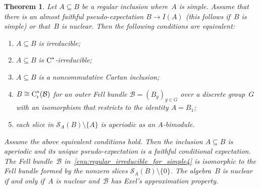 \documentclass[a4paper]{amsart}
\theoremstyle{plain}
\newtheorem{theorem}{Theorem}
\theoremstyle{definition}
\theoremstyle{remark}
\numberwithin{theorem}{section}
\numberwithin{equation}{section}
\newcommand*{\nb}{\nobreakdash}
\newcommand*{\red}{\mathrm{r}}%
\newcommand*{\Cst}{\textup C^*}%
\newcommand*{\Slice}{\mathcal S}%
\newcommand*{\B}{\mathcal B}%
\begin{document}
\begin{theorem}
  \label{thm:regular_irreducible_for_simple}
  Let \(A\subseteq B\) be a regular inclusion where~\(A\) is simple.
  Assume that there is an almost faithful pseudo-expectation \(B\to I(A)\)
  \textup{(}this follows if~\(B\) is simple\textup{)} or that~\(B\) is
  nuclear.
  Then the following conditions are equivalent:
  \begin{enumerate}
  \item \label{enu:regular_irreducible_for_simple1}%
    \(A\subseteq B\) is irreducible;
  \item \label{enu:regular_irreducible_for_simple2}%
    \(A\subseteq B\) is \(\Cst\)\nb-irreducible;
  \item \label{enu:regular_irreducible_for_simple3}%
    \(A\subseteq B\) is a noncommutative Cartan inclusion;
  \item \label{enu:regular_irreducible_for_simple4}%
    \(B\cong \Cst_\red(\B)\)  for an outer Fell bundle
    \(\B=(B_g)_{g\in G}\) over a discrete group~\(G\) with an
    isomorphism that restricts to the identity \(A=B_1\);
  \item \label{enu:regular_irreducible_for_simple5}%
    each slice in \(\Slice_A(B)\setminus \{A\}\) is aperiodic as an
    \(A\)\nb-bimodule.
  \end{enumerate}
  Assume the above equivalent conditions hold.
  Then the inclusion \(A\subseteq B\) is aperiodic and its unique
  pseudo-expectation is a faithful conditional expectation.
  The Fell bundle~\(\B\)
  in~\ref{enu:regular_irreducible_for_simple4} is isomorphic to the
  Fell bundle formed by the nonzero slices
  \(\Slice_A(B)\setminus\{0\}\).
  The algebra~\(B\) is nuclear if and only if~\(A\) is nuclear
  and~\(\B\) has Exel's approximation property.
\end{theorem}
\end{document}
